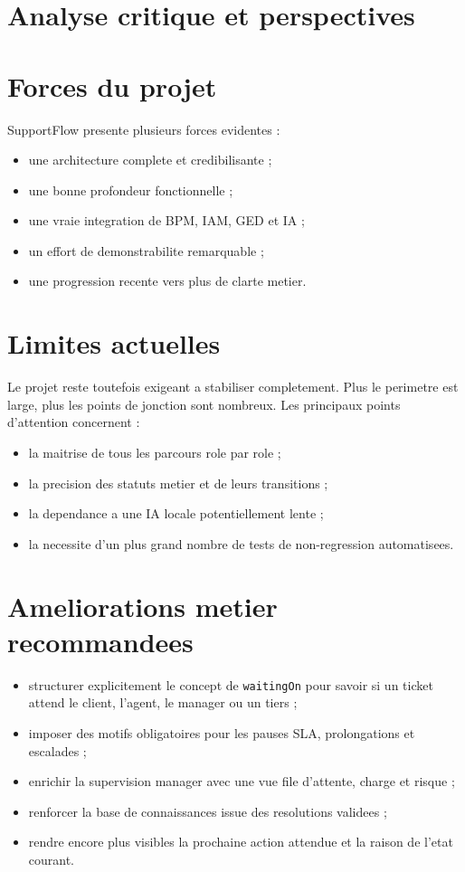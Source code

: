 \section{Analyse critique et perspectives}

\section{Forces du projet}

SupportFlow presente plusieurs forces evidentes :

\begin{itemize}[leftmargin=1.2cm]
  \item une architecture complete et credibilisante ;
  \item une bonne profondeur fonctionnelle ;
  \item une vraie integration de BPM, IAM, GED et IA ;
  \item un effort de demonstrabilite remarquable ;
  \item une progression recente vers plus de clarte metier.
\end{itemize}

\section{Limites actuelles}

Le projet reste toutefois exigeant a stabiliser completement. Plus le perimetre est large, plus les points de jonction sont nombreux. Les principaux points d'attention concernent :

\begin{itemize}[leftmargin=1.2cm]
  \item la maitrise de tous les parcours role par role ;
  \item la precision des statuts metier et de leurs transitions ;
  \item la dependance a une IA locale potentiellement lente ;
  \item la necessite d'un plus grand nombre de tests de non-regression automatisees.
\end{itemize}

\section{Ameliorations metier recommandees}

\begin{itemize}[leftmargin=1.2cm]
  \item structurer explicitement le concept de \texttt{waitingOn} pour savoir si un ticket attend le client, l'agent, le manager ou un tiers ;
  \item imposer des motifs obligatoires pour les pauses SLA, prolongations et escalades ;
  \item enrichir la supervision manager avec une vue file d'attente, charge et risque ;
  \item renforcer la base de connaissances issue des resolutions validees ;
  \item rendre encore plus visibles la prochaine action attendue et la raison de l'etat courant.
\end{itemize}

